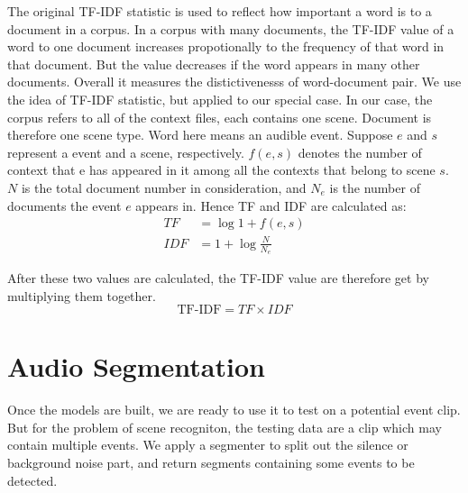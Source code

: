 The original TF-IDF statistic is used to reflect how important a word is to a document in a corpus. 
In a corpus with many documents, the TF-IDF value of a word to one document increases propotionally to the frequency of that word in that document. 
But the value decreases if the word appears in many other documents. 
Overall it measures the distictivenesss of word-document pair. 
We use the idea of TF-IDF statistic, but applied to our special case. 
In our case, the corpus refers to all of the context files, each contains one scene. 
Document is therefore one scene type. 
Word here means an audible event. 
Suppose $e$ and $s$ represent a event and a scene, respectively. 
$f(e,s)$ denotes the number of context that e has appeared in it among all the contexts that belong to scene $s$.  
$N$ is the total document number in consideration, and $N_e$ is the number of documents the event $e$ appears in. 
Hence TF and IDF are calculated as: 
\begin{equation}
\begin{split}
 TF &= \log{1+f(e,s)} \\ 
 IDF &= 1 + \log{\frac{N}{N_e}}
\end{split}
\end{equation} 

After these two values are calculated, the TF-IDF value are therefore get by multiplying them together. 
\begin{equation}
 \text{TF-IDF} = TF \times IDF 
\end{equation}

\section{Audio Segmentation}
Once the models are built, we are ready to use it to test on a potential event clip. 
But for the problem of scene recogniton, the testing data are a clip which may contain multiple events. 
We apply a segmenter to split out the silence or background noise part, and return segments containing some events to be detected. 

